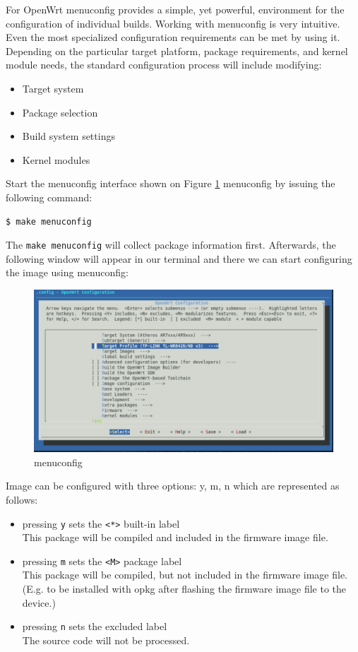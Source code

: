 For OpenWrt menuconfig provides a simple, yet powerful, environment for the configuration of individual builds.
Working with menuconfig is very intuitive.
Even the most specialized configuration requirements can be met by using it.
Depending on the particular target platform, package requirements, and kernel module needs, the standard configuration process will include modifying:\\
\begin{itemize}
    \item Target system
    \item Package selection
    \item Build system settings
    \item Kernel modules
\end{itemize}
Start the menuconfig interface shown on Figure \ref{fig_menuconfig} menuconfig by issuing the following command:
\begin{lstlisting}[columns=fixed,basicstyle=\ttfamily\footnotesize,tabsize=4,backgroundcolor=\color{yellow!10}]
$ make menuconfig
\end{lstlisting}
The {\tt make menuconfig} will collect package information first.
Afterwards, the following window will appear in our terminal and there we can start configuring the image using menuconfig:\\
\begin{figure}[H]
    \centering
    \includegraphics[scale=0.6]{figures/make_menuconfig.pdf}
    \caption{menuconfig}
    \label{fig_menuconfig}
\end{figure}
Image can be configured with three options: y, m, n which are represented as follows:
\begin{itemize}
\item pressing {\tt y} sets the {\tt <*>} built-in label\\
This package will be compiled and included in the firmware image file.
\item pressing {\tt m} sets the {\tt <M>} package label\\
This package will be compiled, but not included in the firmware image file. (E.g. to be installed with opkg after flashing the firmware image file to the device.)
\item pressing {\tt n} sets the {\tt < >} excluded label\\
The source code will not be processed.
\end{itemize}
